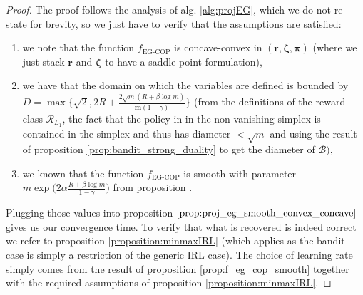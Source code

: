 \begin{proof}
    The proof follows the analysis of alg. \ref{alg:projEG}, which we do not re-state for brevity, so we just have to verify that the assumptions are satisfied:
    \begin{enumerate}
        \item we note that the function $f_\text{EG-COP}$ is concave-convex in $(\bm{r},\bm{\zeta},\bm{\pi})$ (where we just stack $\bm{r}$ and $\bm{\zeta}$ to have a saddle-point formulation),
        \item we have that the domain on which the variables are defined is bounded by $D=\max\Big\{\sqrt{2},2R + \frac{2\sqrt{m}(R+ \beta \log m)}{\bm{m}(1-\gamma)} \Big\}$ (from the definitions of the reward class $\mathcal{R}_{L_1}$, the fact that the policy in in the non-vanishing simplex is contained in the simplex and thus has diameter $<\sqrt{m}$ and using the result of proposition \ref{prop:bandit_strong_duality} to get the diameter of $\mathcal{B})$,
        \item we known that the function $f_\text{EG-COP}$ is smooth with parameter $m \exp \Big( 2 \alpha \frac{R +\beta \log m}{1-\gamma}  \Big)$ from proposition \label{prop:f_eg_cop_smooth}.
    \end{enumerate}
    Plugging those values into proposition $\ref{prop:proj_eg_smooth_convex_concave}$ gives us our convergence time. To verify that what is recovered is indeed correct we refer to proposition \ref{proposition:minmaxIRL} (which applies as the bandit case is simply a restriction of the generic IRL case). The choice of learning rate simply comes from the result of proposition \ref{prop:f_eg_cop_smooth} together with the required assumptions of proposition \ref{proposition:minmaxIRL}.
\end{proof}


